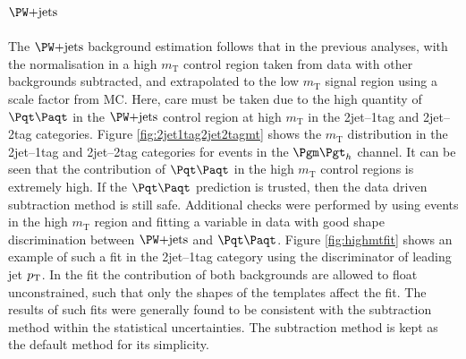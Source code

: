 \subsection{$\WJets$}

The $\WJets$ background estimation follows that in the previous analyses, with
the normalisation in a high $m_{\text{T}}$ control region taken from data with
other backgrounds subtracted, and extrapolated to the low $m_{\text{T}}$ signal
region using a scale factor from \ac{MC}. Here,
care must be taken due to the high quantity of $\ttbar$ in the $\WJets$ control
region at high $m_{\text{T}}$ in the 2jet--1tag and 2jet--2tag categories. 
Figure \ref{fig:2jet1tag2jet2tagmt} shows the 
$m_{\text{T}}$ distribution in the 2jet--1tag and 2jet--2tag categories for
events in the $\mutau$ channel. It can
be seen that the contribution of $\ttbar$ in the high $m_{\text{T}}$ control
regions is extremely high. If the $\ttbar$ prediction is trusted, then the data
driven subtraction method is still safe. Additional checks were performed by
using events in the high $m_{\text{T}}$ region and fitting a variable in data
with good shape discrimination between $\WJets$ and $\ttbar$. Figure
\ref{fig:highmtfit} shows an example of such a fit in the 2jet--1tag category
using the discriminator of leading jet $p_{\mathrm{T}}$. In the fit the contribution of
both backgrounds are allowed to float unconstrained, such that only the shapes of
the templates affect the fit. The results of such fits were generally found to be
consistent with the subtraction method within the statistical uncertainties.
The subtraction method is kept as the default method for its simplicity. 

